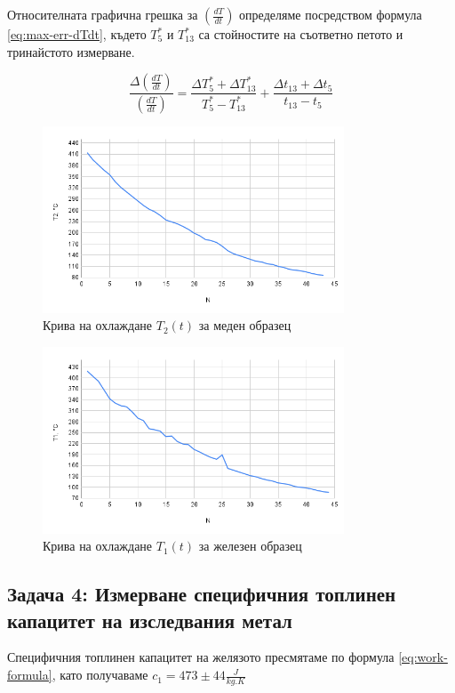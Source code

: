 \documentclass[12pt]{article}
\begin{document}
Относителната графична грешка за $\left(\frac{dT}{dt}\right)$ определяме посредством формула \ref{eq:max-err-dTdt}, където $T^*_5$ и $T^*_{13}$ са стойностите на съответно петото и тринайстото измерване.

\begin{equation}\label{eq:max-err-dTdt}
    \frac{\Delta \left(\frac{dT}{dt}\right)}{\left(\frac{dT}{dt}\right)} = \frac{\Delta T^*_5 + \Delta T^*_{13}}{T^*_5 - T^*_{13}} + \frac{\Delta t_{13} + \Delta t_{5}}{t_{13} - t_{5}}
\end{equation}

\begin{figure}
    \centering
    \includegraphics[width=0.8\textwidth]{images/chart-T2.png}
    \caption{\label{fig:T2-of-t}Крива на охлаждане $T_2(t)$ за меден образец}
\end{figure} 

\begin{figure}
    \centering
    \includegraphics[width=0.8\textwidth]{images/chart-T1.png}
    \caption{\label{fig:T1-of-t}Крива на охлаждане $T_1(t)$ за железен образец}
\end{figure} 

\subsection{Задача 4: Измерване специфичния топлинен капацитет на изследвания метал}
Специфичния топлинен капацитет на желязото пресмятаме по формула \ref{eq:work-formula}, като получаваме $c_1 = 473 \pm 44 \frac{J}{kg.K}$
\end{document}
